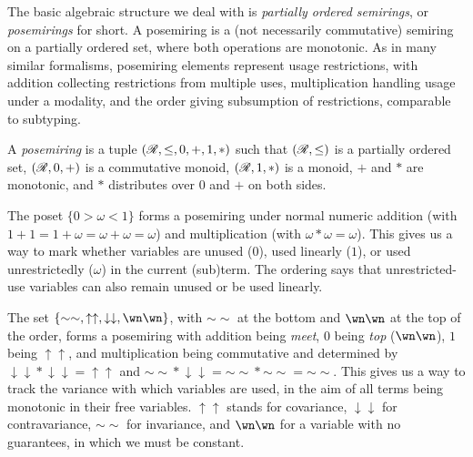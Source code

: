 The basic algebraic structure we deal with is \emph{partially
ordered semirings}, or \emph{posemirings} for short.
A posemiring is a (not necessarily commutative) semiring on a partially ordered
set, where both operations are monotonic.
As in many similar formalisms, posemiring elements represent usage restrictions,
with addition collecting restrictions from multiple uses, multiplication
handling usage under a modality, and the order giving subsumption of
restrictions, comparable to subtyping.

\begin{definition}
  A \emph{posemiring} is a tuple $(\mathscr R, \leq, 0, +, 1, *)$ such that
  $(\mathscr R, \leq)$ is a partially ordered set, $(\mathscr R, 0, +)$ is a commutative
  monoid, $(\mathscr R, 1, *)$ is a monoid, $+$ and $*$ are monotonic, and $*$
  distributes over $0$ and $+$ on both sides.
\end{definition}

\begin{example}\label{thm:linearity}
  The poset $\{0 > \omega < 1\}$ forms a posemiring under normal numeric
  addition (with $1 + 1 = 1 + \omega = \omega + \omega = \omega$) and
  multiplication (with $\omega * \omega = \omega$).
  This gives us a way to mark whether variables are unused ($0$), used linearly
  ($1$), or used unrestrictedly ($\omega$) in the current (sub)term.
  The ordering says that unrestricted-use variables can also remain unused or
  be used linearly.
\end{example}

\begin{example}[Variance]\label{thm:variance}
  The set
  $\{{\sim\sim}, {\uparrow\uparrow}, {\downarrow\downarrow}, {\wn\wn}\}$,
  with ${\sim\sim}$ at the bottom and ${\wn\wn}$ at the top of the order, forms
  a posemiring with addition being \emph{meet}, $0$ being \emph{top}
  (${\wn\wn}$), $1$ being ${\uparrow\uparrow}$, and multiplication being
  commutative and determined by
  ${\downarrow\downarrow} * {\downarrow\downarrow} = {\uparrow\uparrow}$ and
  ${\sim\sim} * {\downarrow\downarrow} = {\sim\sim} * {\sim\sim} = {\sim\sim}$.
  This gives us a way to track the variance with which variables are used, in
  the aim of all terms being monotonic in their free variables.
  ${\uparrow\uparrow}$ stands for covariance, ${\downarrow\downarrow}$ for
  contravariance, ${\sim\sim}$ for invariance, and ${\wn\wn}$ for a variable
  with no guarantees, in which we must be constant.
\end{example}

